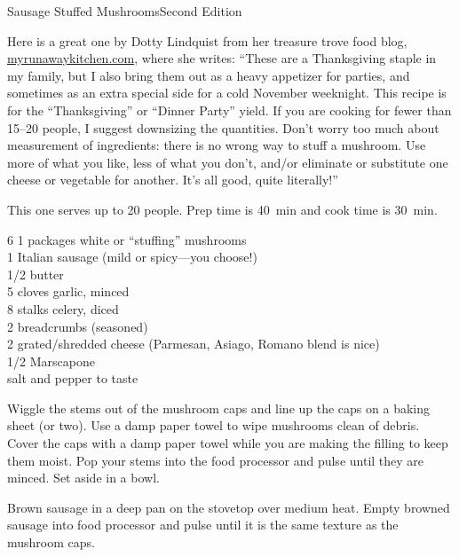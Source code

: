 \begin{entry}{Sausage Stuffed Mushrooms}{Second Edition}

\begin{open}
  Here is a great one by Dotty Lindquist from her treasure trove food blog, \\
  \url{myrunawaykitchen.com}, where she writes: ``These are a Thanksgiving
  staple in my family, but I also bring them out as a heavy appetizer for
  parties, and sometimes as an extra special side for a cold November
  weeknight.  This recipe is for the ``Thanksgiving'' or ``Dinner Party''
  yield.  If you are cooking for fewer than \numrange{15}{20} people, I
  suggest downsizing the quantities.  Don't worry too much about measurement
  of ingredients: there is no wrong way to stuff a mushroom.  Use more of what
  you like, less of what you don't, and/or eliminate or substitute one cheese
  or vegetable for another.  It's all good, quite literally!''

  This one serves up to 20 people.  Prep time is \SI{40}{\minute} and cook
  time is \SI{30}{\minute}.
\end{open}
\begin{ingredients}
    6 \SI{1}{\quart} packages white or ``stuffing'' mushrooms\\
    \SI{1}{\pound} Italian sausage (mild or spicy---you choose!)\\
    \SI{1/2}{\cup} butter\\
    5 cloves garlic, minced\\
    8 stalks celery, diced\\
    \SI{2}{\cup} breadcrumbs (seasoned)\\
    \SI{2}{\cup} grated/shredded cheese (Parmesan, Asiago, Romano blend is
    nice)\\
    \SI{1/2}{\cup} Marscapone\\
    salt and pepper to taste
\end{ingredients}
Wiggle the stems out of the mushroom caps and line up the caps on a baking sheet
(or two). Use a damp paper towel to wipe mushrooms clean of debris. Cover the
caps with a damp paper towel while you are making the filling to keep them
moist. Pop your stems into the food processor and pulse until they are minced.
Set aside in a bowl.

Brown sausage in a deep pan on the stovetop over medium heat. Empty browned
sausage into food processor and pulse until it is the same texture as the
mushroom caps.


\end{entry}
